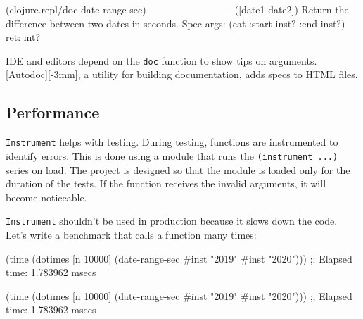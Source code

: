 \else

\begin{english}
  \begin{clojure}
(clojure.repl/doc date-range-sec)
-------------------------
([date1 date2])
  Return the difference between two dates in seconds.
Spec
  args: (cat :start inst? :end inst?)
  ret: int?
  \end{clojure}
\end{english}

\fi


IDE and editors depend on the \verb|doc| function to show tips on arguments. [Autodoc][-3mm], a utility for building documentation, adds specs to HTML files.

\subsection{Performance}


\verb|Instrument| helps with testing. During testing, functions are instrumented to identify errors. This is done using a module that runs the \verb|(instrument ...)| series on load. The project is designed so that the module is loaded only for the duration of the tests. If the function receives the invalid arguments, it will become noticeable.


\verb|Instrument| shouldn't be used in production because it slows down the code. Let's write a benchmark that calls a function many times:


\ifx\DEVICETYPE\MOBILE

\begin{english}
  \begin{clojure}
(time
 (dotimes [n 10000]
   (date-range-sec #inst "2019"
                   #inst "2020")))
;; Elapsed time: 1.783962 msecs
  \end{clojure}
\end{english}

\else

\begin{english}
  \begin{clojure}
(time
 (dotimes [n 10000]
   (date-range-sec #inst "2019" #inst "2020")))
;; Elapsed time: 1.783962 msecs
  \end{clojure}
\end{english}

